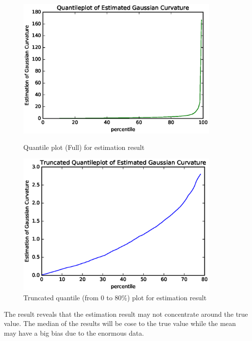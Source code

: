 \documentclass{article}
\begin{document}
\begin{figure}[htbp]
\centering
\begin{minipage}{0.45\textwidth}
\includegraphics[width=0.9\textwidth]{Quantileplot-size-4000-epsilon-15.eps}
\caption{Quantile plot (Full) for estimation result}
\label{qp4000}
\end{minipage}
\begin{minipage}{0.45\textwidth}
\includegraphics[width=0.9\textwidth]{Trun-Quantileplot-size-4000-epsilon-15.eps}
\caption{Truncated quantile (from 0 to 80\%) plot for estimation result}
\label{tqp4000}
\end{minipage}
\end{figure}
The result reveals that the estimation result may not concentrate around the true value. The median of the results will be cose to the true value while the mean may have a big bias due to the enormous data. 

\newpage
\end{document}
